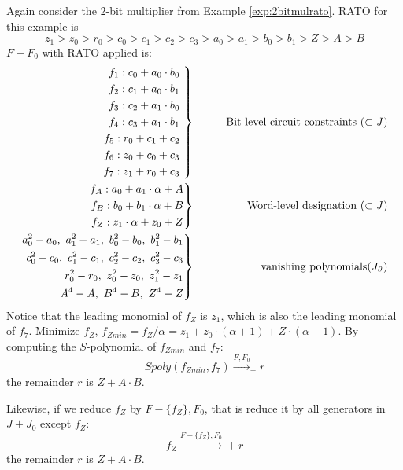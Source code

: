 \begin{Example}
\label{exp:absGood}
Again consider the $2$-bit multiplier from Example 
\ref{exp:2bitmulrato}.
RATO for this example is
\begin{equation}
z_1 > z_0 > r_0 > c_0 > c_1 > c_2 > c_3 > a_0 > a_1 > b_0 > b_1 > Z > A > B 
\end{equation}
$F+F_0$ with RATO applied is:
\begin{eqnarray}
 \left .  
	\begin{aligned}
		f_1:c_0+a_0 \cdot b_0  \\
		f_2:c_1+a_0 \cdot b_1  \\
		f_3:c_2+a_1 \cdot b_0  \\
		f_4:c_3+a_1 \cdot b_1  \\
		f_5:r_0+c_1 + c_2		\\
		f_6:z_0+c_0 + c_3		\\
		f_7:z_1+r_0 + c_3		
	\end{aligned} 
 \ \right\}
 &\qquad&  {\it  \text{Bit-level circuit constraints} ~(\subset J)} \nonumber \\
 \left . 
	\begin{aligned}
		f_{A}:a_0+a_1\cdot \alpha + A  \\ 
		f_{B}:b_0+b_1\cdot \alpha + B \\ 
		f_{Z}:z_1\cdot \alpha + z_0 + Z  
	\end{aligned} 
 \right\}
 &\qquad&  {\it  \text{Word-level designation} ~(\subset J)} \nonumber \\
  \left . 
	\begin{aligned}
		a_0^2-a_0, ~a_1^2-a_1,~b_0^2-b_0, ~b_1^2-b_1   \\ 
		c_0^2-c_0, ~c_1^2-c_1,~c_2^2-c_2, ~c_3^2-c_3  \\ 
		r_0^2-r_0, ~z_0^2-z_0,~z_1^2-z_1    \\ 
		A^4-A, ~B^4-B ,~Z^4-Z		  
	\end{aligned} 
 \right\}
 &\qquad&  {\it \text{vanishing polynomials} (J_0)} \nonumber
\end{eqnarray}
Notice that the leading monomial of $f_Z$ is $z_1$, which is also the leading monomial 
of $f_7$.
Minimize $f_Z$, 
$f_{Zmin}=f_Z/\alpha = z_1 +z_0\cdot(\alpha+1)+Z\cdot(\alpha+1)$.
By computing the $S$-polynomial of $f_{Zmin}$ and $f_7$:
\begin{equation}
Spoly(f_{Zmin},f_{7})\stackrel{F,F_0}{\longrightarrow}_+ r \nonumber
\end{equation}
the remainder $r$ is $Z+A\cdot B$.

Likewise, if we reduce $f_{Z}$ by $F-\{f_Z\},F_0$, that is reduce it by all
generators in $J+J_0$ except $f_Z$:
\begin{equation}
f_{Z}\xrightarrow{F-\{f_Z\},F_0} + r \nonumber
\end{equation}
the remainder $r$ is $Z+A\cdot B$. 
\end{Example}

